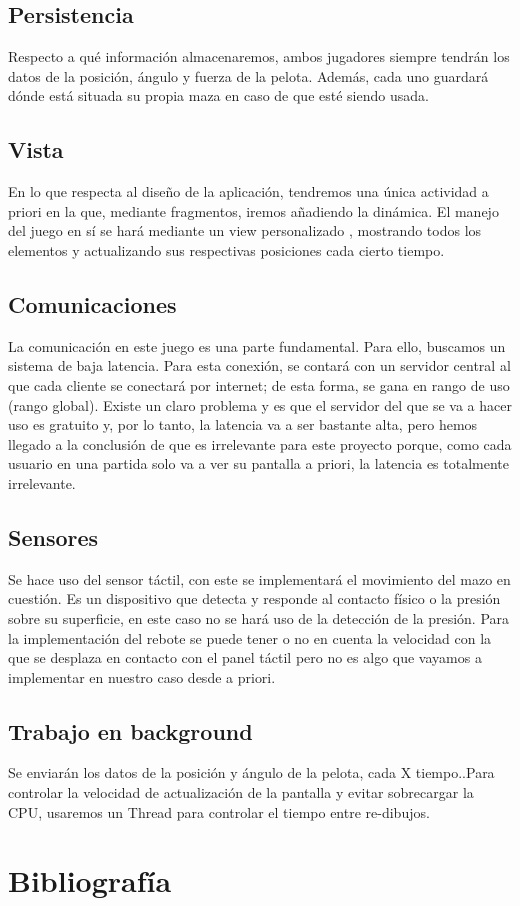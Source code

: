 \documentclass[a4paper,openright,12pt]{article}
\begin{document}
\subsection{Persistencia}
Respecto a qué información almacenaremos, ambos jugadores siempre tendrán los datos de la posición, ángulo y fuerza de la pelota. Además, cada uno guardará dónde está situada su propia maza en caso de que esté siendo usada.
\subsection{Vista}
En lo que respecta al diseño de la aplicación, tendremos una única actividad a priori en la que, mediante fragmentos, iremos añadiendo la dinámica. El manejo del juego en sí se hará mediante un view personalizado , mostrando todos los elementos y actualizando sus respectivas posiciones cada cierto tiempo. 

\subsection{Comunicaciones}
La comunicación en este juego es una parte fundamental. Para ello, buscamos un sistema de baja latencia. Para esta conexión, se contará con un servidor central al que cada cliente se conectará por internet; de esta forma, se gana en rango de uso (rango global). Existe un claro problema y es que el servidor del que se va a hacer uso es gratuito y, por lo tanto, la latencia va a ser bastante alta, pero hemos llegado a la conclusión de que es irrelevante para este proyecto porque, como cada usuario en una partida solo va a ver su pantalla a priori, la latencia es totalmente irrelevante.

\subsection{Sensores}
Se hace uso del sensor táctil, con este se implementará el movimiento del mazo en cuestión. Es un dispositivo que detecta y responde al contacto físico o la presión sobre su superficie, en este caso no se hará uso de la detección de la presión. Para la implementación del rebote se puede tener o no en cuenta la velocidad con la que se desplaza en contacto con el panel táctil pero no es algo que vayamos a implementar en nuestro caso desde a priori.
\subsection{Trabajo en background}
Se enviarán los datos de la posición y ángulo de la pelota, cada X tiempo..Para controlar la velocidad de actualización de la pantalla y evitar sobrecargar la CPU, usaremos un Thread para controlar el tiempo entre re-dibujos.
\\


\section{Bibliografía}


\end{document}
